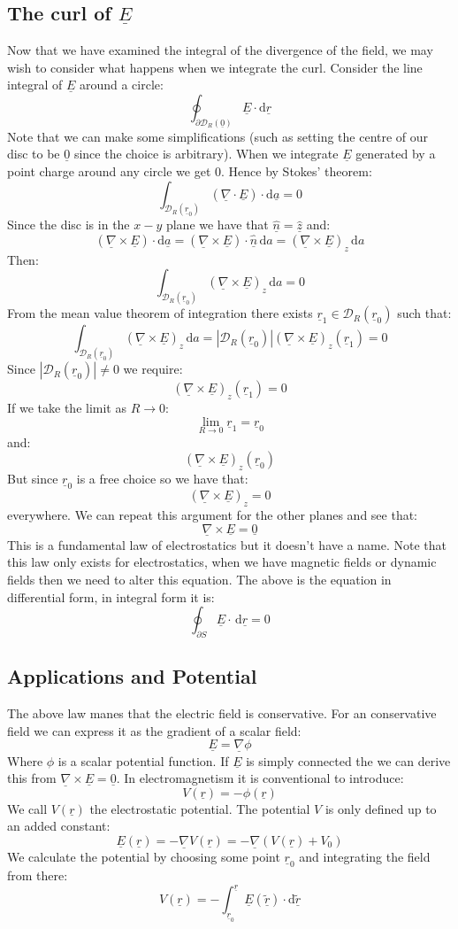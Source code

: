 \documentclass[12pt]{article}
\newcommand{\dive}[1]{\underline{\nabla}\cdot\underline{#1}}
\newcommand{\grad}[1]{\underline{\nabla}#1}
\newcommand{\curl}[1]{\underline{\nabla}\times \underline{#1}}
\begin{document}
\subsection{The curl of \(\underline{E}\)}
Now that we have examined the integral of the divergence of the field, we may wish to consider what happens when we integrate the curl. Consider the line integral of \(\underline{E}\) around a circle:
\[\oint_{\partial\mathcal{D}_R(\underline{0})}\underline{E}\cdot \text{d}\underline{r}\]
Note that we can make some simplifications (such as setting the centre of our disc to be \(\underline{0}\) since the choice is arbitrary). When we integrate \(\underline{E}\) generated by a point charge around any circle we get \(0\). Hence by Stokes' theorem:
\[\int_{\mathcal{D}_R(\underline{r}_0)}(\dive{E})\cdot\text{d}\underline{a}=0\]
Since the disc is in the \(x-y\) plane we have that \(\hat{\underline{n}}=\hat{\underline{z}}\) and:
\[(\curl{E})\cdot\text{d}\underline{a}=(\curl{E})\cdot\underline{\hat{n}}\,\text{d}a=(\curl{E})_z\,\text{d}a\]
Then:
\[\int_{\mathcal{D}_R(\underline{r}_0)}(\curl{E})_z\,\text{d}a=0\]
From the mean value theorem of integration there exists \(\underline{r}_1\in\mathcal{D}_R(\underline{r}_0)\) such that:
\[\int_{\mathcal{D}_R(\underline{r}_0)}(\curl{E})_z\,\text{d}a=|\mathcal{D}_R(\underline{r}_0)|(\curl{E})_z(\underline{r}_1)=0\]
Since \(|\mathcal{D}_R(\underline{r}_0)|\ne 0\) we require:
\[(\curl{E})_z(\underline{r}_1)=0\]
If we take the limit as \(R\to 0\):
\[\lim_{R\to 0}\underline{r}_1=\underline{r}_0\]
and:
\[(\curl{E})_z(\underline{r}_0)\]
But since \(\underline{r}_0\) is a free choice so we have that:
\[(\curl{E})_z=0\]
everywhere. We can repeat this argument for the other planes and see that:
\[\curl{E}=\underline{0}\]
This is a fundamental law of electrostatics but it doesn't have a name. Note that this law only exists for electrostatics, when we have magnetic fields or dynamic fields then we need to alter this equation. The above is the equation in differential form, in integral form it is:
\[\oint_{\partial S}\underline{E}\cdot \,\text{d}\underline{r}=0\]
\subsection{Applications and Potential}
The above law manes that the electric field is conservative. For an conservative field we can express it as the gradient of a scalar field:
\[\underline{E}=\grad{\phi}\]
Where \(\phi\) is a scalar potential function. If \(\underline{E}\) is simply connected the we can derive this from \(\curl{E}=\underline{0}\). In electromagnetism it is conventional to introduce:
\[V(\underline{r})=-\phi(\underline{r})\]
We call \(V(\underline{r})\) the electrostatic potential. The potential \(V\) is only defined up to an added constant:
\[\underline{E}(\underline{r})=-\grad{V(\underline{r})}=-\grad{(V(\underline{r})+V_0)}\]
We calculate the potential by choosing some point \(\underline{r}_0\) and integrating the field from there:
\[V(\underline{r})=-\int^{\underline{r}}_{\underline{r}_0}\underline{E}(\underline{\tilde{r}})\cdot\text{d}\underline{\tilde{r}}\]
\end{document}
